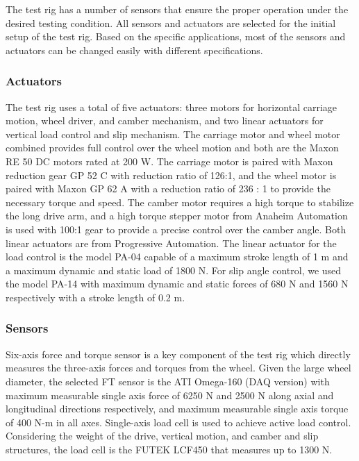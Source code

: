 \documentclass{article}
\begin{document}


The test rig has a number of sensors that ensure the proper operation under the desired testing condition. All sensors and actuators are selected for the initial setup of the test rig. Based on the specific applications, most of the sensors and actuators can be changed easily with different specifications. 


\subsubsection{Actuators}

The test rig uses a total of five actuators: three motors for horizontal carriage motion, wheel driver, and camber mechanism, and two linear actuators for vertical load control and slip mechanism. The carriage motor and wheel motor combined provides full control over the wheel motion and both are the Maxon RE 50 DC motors rated at 200 W. The carriage motor is paired with Maxon reduction gear GP 52 C with reduction ratio of 126:1, and the wheel motor is paired with Maxon GP 62 A with a reduction ratio of 236 : 1 to provide the necessary torque and speed. The camber motor requires a high torque to stabilize the long drive arm, and a high torque stepper motor from Anaheim Automation is used with 100:1 gear to provide a precise control over the camber angle. Both linear actuators are from Progressive Automation. The linear actuator for the load control is the model PA-04 capable of a maximum stroke length of 1 m and a maximum dynamic and static load of 1800 N. For slip angle control, we used the model PA-14 with maximum dynamic and static forces of 680 N and 1560 N respectively with a stroke length of 0.2 m. 

\subsubsection{Sensors}

Six-axis force and torque sensor is a key component of the test rig which directly measures the three-axis forces and torques from the wheel. Given the large wheel diameter, the selected FT sensor is the ATI Omega-160 (DAQ version) with maximum measurable single axis force of 6250 N and 2500 N along axial and longitudinal directions respectively, and maximum measurable single axis torque of 400 N-m in all axes. Single-axis load cell is used to achieve active load control. Considering the weight of the drive, vertical motion, and camber and slip structures, the load cell is the FUTEK LCF450 that measures up to 1300 N. 
\end{document}
